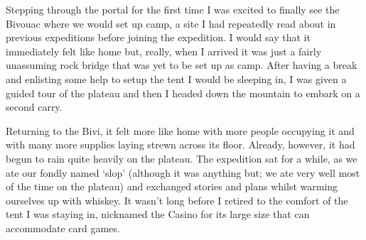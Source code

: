 
Stepping through the portal for the first time I was excited to finally
see the Bivouac where we would set up camp, a site I had repeatedly read
about in previous expeditions before joining the expedition. I would say
that it immediately felt like home but, really, when I arrived it was
just a fairly unassuming rock bridge that was yet to be set up as camp.
After having a break and enlisting some help to setup the tent I would
be sleeping in, I was given a guided tour of the plateau and then I headed down
the mountain to embark on a second carry.




Returning to the Bivi, it felt more like home with more people occupying
it and with many more supplies laying strewn across its floor. Already,
however, it had begun to rain quite heavily on the plateau. The
expedition sat for a while, as we ate our fondly named `slop' (although
it was anything but; we ate very well most of the time on the plateau)
and exchanged stories and plans whilst warming ourselves up with
whiskey. It wasn't long before I retired to the comfort of the tent I
was staying in, nicknamed the Casino for its large size that can
accommodate card games.


